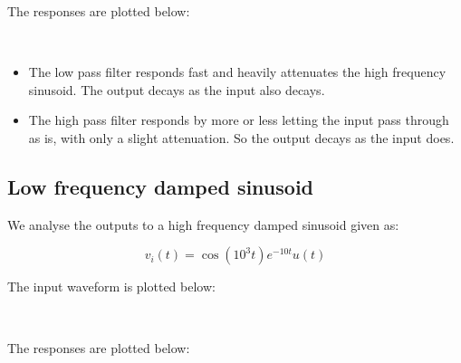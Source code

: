 \documentclass[11pt]{article}
\providecommand{\tightlist}{%
      \setlength{\itemsep}{0pt}\setlength{\parskip}{0pt}}
\begin{document}
	
		
    The responses are plotted below:

	

	

    \begin{center}
    \end{center}
    { \hspace*{\fill} \\}
    
	
		
    \begin{itemize}
\tightlist
\item
  The low pass filter responds fast and heavily attenuates the high
  frequency sinusoid. The output decays as the input also decays.
\item
  The high pass filter responds by more or less letting the input pass
  through as is, with only a slight attenuation. So the output decays as
  the input does.
\end{itemize}

	

	
		
    \subsection{Low frequency damped
sinusoid}\label{low-frequency-damped-sinusoid}

We analyse the outputs to a high frequency damped sinusoid given as:

\[v_i(t) = \cos(10^3 t) e^{-10t} u(t)\]

	

	
		
    The input waveform is plotted below:

	

	

    \begin{center}
    \end{center}
    { \hspace*{\fill} \\}
    
	
		
    The responses are plotted below:

	

	

    \begin{center}
    \end{center}
    { \hspace*{\fill} \\}
    
\end{document}
